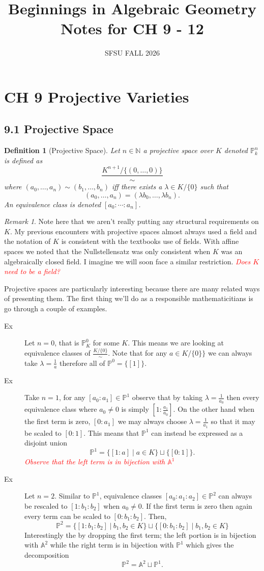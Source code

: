 \documentclass[40pt]{article}
\title{Beginnings in Algebraic Geometry Notes for CH 9 - 12}
\date{SFSU FALL 2026}
\newtheorem{definition}{Definition}[section]
\newcommand{\Proj}{\mathbb{P}}
\newcommand{\N}{\mathbb{N}}
\newcommand{\A}{\mathbb{A}}
\newcommand{\note}[1]{\textcolor{red}{\emph{#1}}}
\theoremstyle{remark}
\newtheorem{remark}[theorem]{Remark}
\begin{document}
\maketitle
\tableofcontents
\pagebreak
\section{CH 9 Projective Varieties}
\subsection{9.1 Projective Space}
\begin{definition}[Projective Space]
	Let $n \in \N$ a projective space over $K$ denoted $\Proj_k^n$ is defined as 
	\[
	\frac{K^{n+1}/\{(0,\dots,0)\}}{\sim}
	\]
	where $(a_0,\dots,a_{n}) \sim (b_1,\dots,b_{n})$ iff there exists a $\lambda \in K/\{0\}$ such that 
	\[
	(a_0,\dots,a_{n})=(\lambda b_0,\dots,\lambda b_n).
	\]
	An equivalence class is denoted $[a_0:\cdots:a_n]$. 
\end{definition}
\begin{remark}
	Note here that we aren't really putting any structural requirements on $K$. My previous encounters with projective spaces almost always used a field and the notation of $K$ is consistent with the textbooks use of fields. With affine spaces we noted that the Nullstellensatz was only consistent when $K$ was an algebraically closed field. I imagine we will soon face a similar restriction. \note{Does $K$ need to be a field?}
\end{remark}
Projective spaces are particularly interesting because there are many related ways of presenting them. The first thing we'll do as a responsible mathematicitians is go through a couple of examples. 
\begin{description}
	\item[Ex] Let $n = 0$, that is $\Proj^0_K$ for some $K$. This means we are looking at equivalence classes of $\frac{K/\{0\}}{\sim}$. Note that for any $a \in K/\{0\}\}$ we can always take $\lambda = \frac{1}{a}$ therefore all of $\Proj^0 = \{[1]\}$. 
	\item[Ex] Take $n = 1$,  for any $[a_0:a_1] \in \Proj^1$ observe that by taking $\lambda = \frac{1}{a_0}$ then every equivalence class where $a_0 \neq 0$ is simply $[1: \frac{a_1}{a_0}]$. On the other hand when the first term is zero, $[0:a_1]$ we may always choose $\lambda = \frac{1}{a_1}$ so that it may be scaled to $[0:1]$. This means that $\Proj^1$ can instead be expressed as a disjoint union
	\[
	\Proj^1 = \{[1:a] \; | \; a \in K\}\sqcup\{[0:1]\}.
	\]
	\note{Observe that the left term is in bijection with $\A^1$}
	\item[Ex] Let $n = 2$. Similar to $\Proj^1$, equivalence classes $[a_0:a_1:a_2] \in \Proj^2$ can always be rescaled to $[1 : b_1 : b_2]$ when $a_0 \neq 0$. If the first term is zero then again every term can be scaled to $[0:b_1:b_2]$. Then, 
	\[
	\Proj^2 = \{[1:b_1:b_2] \; | \: b_1,b_2 \in K\}\sqcup\{[0:b_1:b_2] \; | \; b_1,b_2 \in K\}
	\]
	Interestingly the by dropping the first term; the left portion is in bijection with $\A^2$ while the right term is in bijection with $\Proj^1$ which gives the decomposition
	\[
	\Proj^2 = \A^2\sqcup\Proj^1.
	\]
\end{description}
\end{document}
